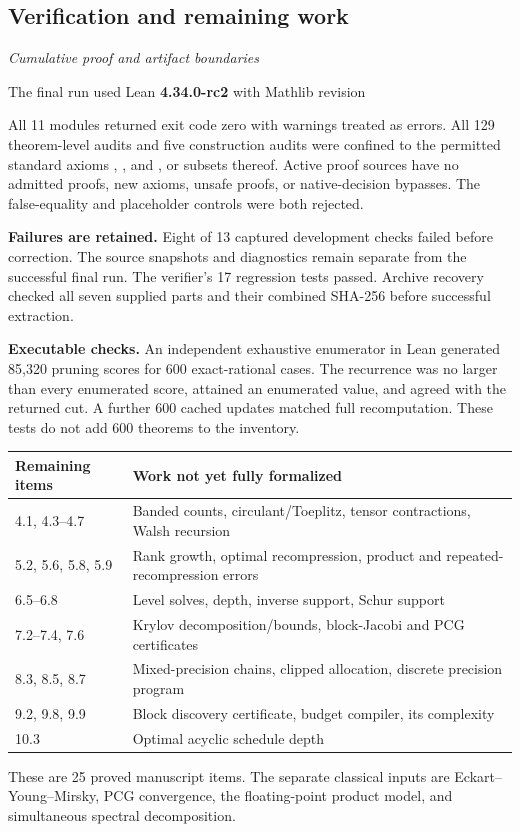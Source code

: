 \subsection{Verification and remaining work}\label{supp2:subsection:007}\textit{Cumulative proof and artifact boundaries}\par
The final run used Lean \textbf{4.34.0-rc2} with Mathlib revision
\begin{center}\end{center}
All 11 modules returned exit code zero with warnings treated as errors. All 129 theorem-level audits and five construction audits were confined to the permitted standard axioms , , and , or subsets thereof. Active proof sources have no admitted proofs, new axioms, unsafe proofs, or native-decision bypasses. The false-equality and placeholder controls were both rejected.

\textbf{Failures are retained.} Eight of 13 captured development checks failed before correction. The source snapshots and diagnostics remain separate from the successful final run. The verifier's 17 regression tests passed. Archive recovery checked all seven supplied parts and their combined SHA-256 before successful extraction.

\textbf{Executable checks.} An independent exhaustive enumerator in Lean generated 85,320 pruning scores for 600 exact-rational cases. The recurrence was no larger than every enumerated score, attained an enumerated value, and agreed with the returned cut. A further 600 cached updates matched full recomputation. These tests do not add 600 theorems to the inventory.

\begin{center}\small
\renewcommand{\arraystretch}{1.2}
\begin{tabular}{@{}p{}p{}@{}}
\toprule
Remaining items & Work not yet fully formalized\\
\midrule
4.1, 4.3--4.7 & Banded counts, circulant/Toeplitz, tensor contractions, Walsh recursion\\
5.2, 5.6, 5.8, 5.9 & Rank growth, optimal recompression, product and repeated-recompression errors\\
6.5--6.8 & Level solves, depth, inverse support, Schur support\\
7.2--7.4, 7.6 & Krylov decomposition/bounds, block-Jacobi and PCG certificates\\
8.3, 8.5, 8.7 & Mixed-precision chains, clipped allocation, discrete precision program\\
9.2, 9.8, 9.9 & Block discovery certificate, budget compiler, its complexity\\
10.3 & Optimal acyclic schedule depth\\
\bottomrule
\end{tabular}
\end{center}
These are 25 proved manuscript items. The separate classical inputs are Eckart--Young--Mirsky, PCG convergence, the floating-point product model, and simultaneous spectral decomposition.

